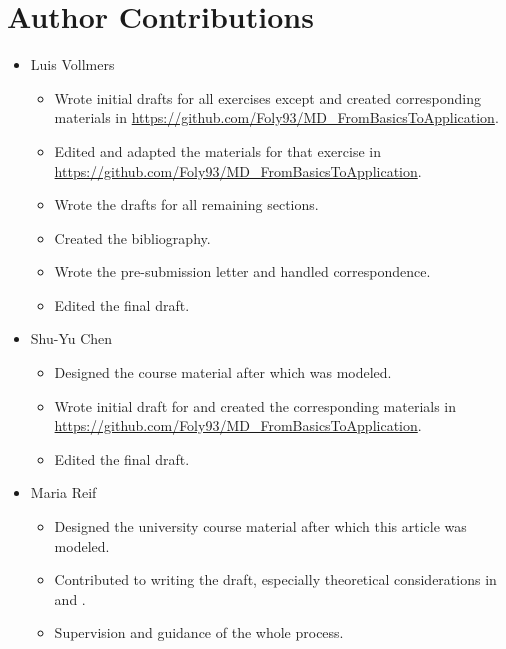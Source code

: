 \documentclass[9pt,tutorial]{livecoms}
\newcommand{\githubrepository}{\url{https://github.com/Foly93/MD_FromBasicsToApplication}}
\begin{document}
\section*{Author Contributions}
\begin{itemize}
    \item Luis Vollmers
    \begin{itemize}\begingroup\fontsize{7pt}{7pt}\selectfont
        \item Wrote initial drafts for all exercises except  and created corresponding materials in \githubrepository.
        \item Edited  and adapted the materials for that exercise in \githubrepository.
        \item Wrote the drafts for all remaining sections.
        \item Created the bibliography.
        \item Wrote the pre-submission letter and handled correspondence.
        \item Edited the final draft.
    \end{itemize}\endgroup
    \item Shu-Yu Chen
    \begin{itemize}\begingroup\fontsize{7pt}{7pt}\selectfont
        \item Designed the course material after which  was modeled.
        \item Wrote initial draft for  and created the corresponding materials in \githubrepository.
        \item Edited the final draft.
    \end{itemize}\endgroup
    \item Maria Reif
    \begin{itemize}\begingroup\fontsize{7pt}{7pt}\selectfont
        \item Designed the university course material after which this article was modeled.
        \item Contributed to writing the draft, especially theoretical considerations in  and .
        \item Supervision and guidance of the whole process.

\end{itemize}
\end{itemize}
\end{document}
